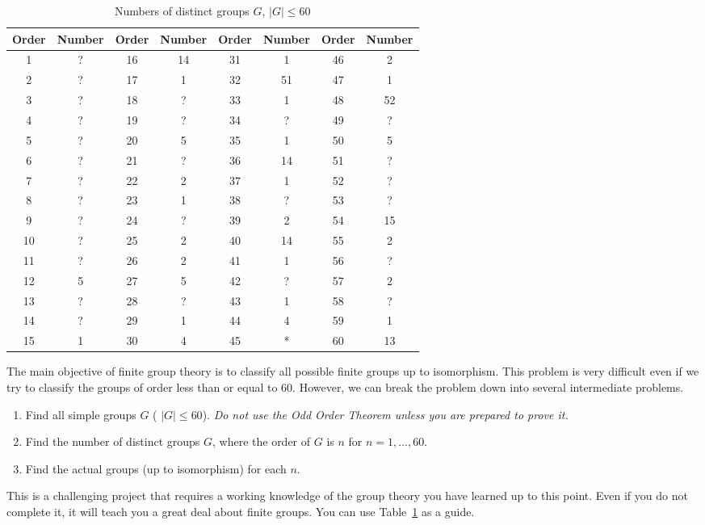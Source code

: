  
\begin{table}[htb]
{\small
\begin{center}
\begin{tabular}{|cc|cc|cc|cc|}
\hline
Order & Number & Order & Number & Order & Number & Order &
Number \\
\hline
1  & ?  & 16 & 14 & 31 & 1  & 46 & 2  \\
2  & ?  & 17 & 1  & 32 & 51 & 47 & 1  \\
3  & ?  & 18 & ?  & 33 & 1  & 48 & 52 \\
4  & ?  & 19 & ?  & 34 & ?  & 49 & ?  \\
5  & ?  & 20 & 5  & 35 & 1  & 50 & 5  \\
6  & ?  & 21 & ?  & 36 & 14 & 51 & ?  \\
7  & ?  & 22 & 2  & 37 & 1  & 52 & ?  \\
8  & ?  & 23 & 1  & 38 & ?  & 53 & ?  \\
9  & ?  & 24 & ?  & 39 & 2  & 54 & 15 \\
10 & ?  & 25 & 2  & 40 & 14 & 55 & 2  \\
11 & ?  & 26 & 2  & 41 & 1  & 56 & ?  \\
12 & 5  & 27 & 5  & 42 & ?  & 57 & 2  \\
13 & ?  & 28 & ?  & 43 & 1  & 58 & ?  \\
14 & ?  & 29 & 1  & 44 & 4  & 59 & 1  \\
15 & 1  & 30 & 4  & 45 & *  & 60 & 13 \\
\hline
\end{tabular}
\caption{Numbers of distinct groups $G$, $|G| \leq 60$ }
\end{center}}\label{sylow:project}
\end{table}
 
 
{\small
 
\noindent 
The main objective of finite group theory is to classify all possible
finite groups up to isomorphism.  This problem is very difficult even
if we try to classify the groups of order less than or equal to 60.
However, we can break the problem down into several intermediate
problems. 
\begin{enumerate}
 
\item
Find all simple groups $G$ ( $|G| \leq 60$). \emph{Do not use the Odd
Order Theorem unless you are prepared to prove it.}
 
\item
Find the number of distinct groups $G$, where the order of $G$ is $n$
for $n = 1, \ldots, 60$. 
 
\item
Find the  actual groups (up to isomorphism) for each $n$.
 
\end{enumerate}
This is a challenging project that requires a working knowledge of the
group theory you have learned up to this point. Even if you do
not complete it, it will teach you a great deal about finite groups. You
can use Table~\ref{sylow:project} as a guide. 
}
 
